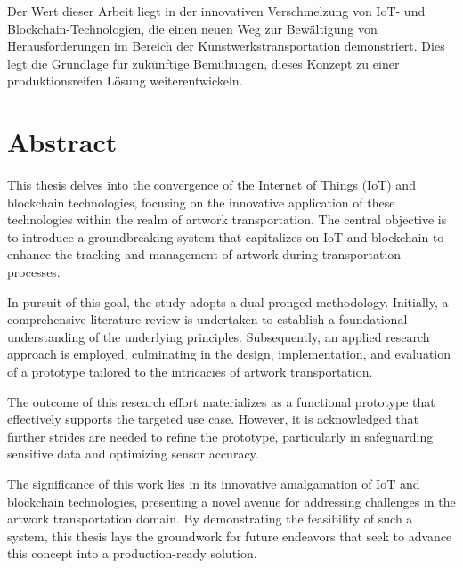 Der Wert dieser Arbeit liegt in der innovativen Verschmelzung von IoT- und Blockchain-Technologien, die einen neuen Weg zur Bewältigung von Herausforderungen im Bereich der Kunstwerkstransportation demonstriert. Dies legt die Grundlage für zukünftige Bemühungen, dieses Konzept zu einer produktionsreifen Lösung weiterentwickeln.


\chapter*{Abstract}
This thesis delves into the convergence of the Internet of Things (IoT) and blockchain technologies, focusing on the innovative application of these technologies within the realm of artwork transportation. The central objective is to introduce a groundbreaking system that capitalizes on IoT and blockchain to enhance the tracking and management of artwork during transportation processes.

In pursuit of this goal, the study adopts a dual-pronged methodology. Initially, a comprehensive literature review is undertaken to establish a foundational understanding of the underlying principles. Subsequently, an applied research approach is employed, culminating in the design, implementation, and evaluation of a prototype tailored to the intricacies of artwork transportation.

The outcome of this research effort materializes as a functional prototype that effectively supports the targeted use case. However, it is acknowledged that further strides are needed to refine the prototype, particularly in safeguarding sensitive data and optimizing sensor accuracy.

The significance of this work lies in its innovative amalgamation of IoT and blockchain technologies, presenting a novel avenue for addressing challenges in the artwork transportation domain. By demonstrating the feasibility of such a system, this thesis lays the groundwork for future endeavors that seek to advance this concept into a production-ready solution.
